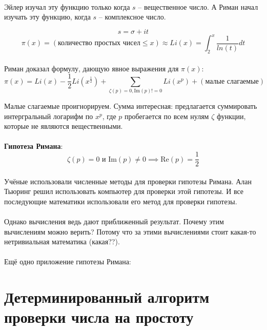 \documentclass{article}
\begin{document}
\paragraph{}
Эйлер изучал эту функцию только когда $s$ -- вещественное число.
А Риман начал изучать эту функцию, когда $s$ -- комплексное число.

$$ s = \sigma + it $$
$$ \pi(x) = (\text{количество простых чисел} \le x) \approx Li(x)
    = \int_{2}^{x} \frac{1}{ln(t)} dt
$$


\paragraph{}
Риман доказал формулу, дающую явное выражения для $\pi(x)$:
$$
    \pi(x) = Li(x) - \frac{1}{2} Li(x^\frac{1}{2}) + \sum_{{\zeta(p) = 0}, \text{Im}(p) != 0}
    Li(x^p) + (\text{малые слагаемые})
$$

Малые слагаемые проигнорируем. Сумма интересная: предлагается суммировать
интергральный логарифм по $x^p$, где $p$ пробегается по всем нулям $\zeta$ функции,
которые не являются вещественными. 

\paragraph{}
\textbf{Гипотеза Римана}:
$$
    \zeta(p) = 0 \text{ и } \text{Im}(p) \ne 0 \implies \text{Re}(p) = \frac{1}{2}
$$

\paragraph{}
Учёные использовали численные методы для проверки гипотезы Римана.
Алан Тьюринг решил использовать компьютер для проверки этой гипотезы.
И все последующие математики использовали его метод для проверки гипотезы.

\paragraph{}
Однако вычисления ведь дают приближенный результат. Почему этим вычислениям можно верить?
Потому что за этими вычислениями стоит какая-то нетривиальная математика (какая??).

\paragraph{}
Ещё одно приложение гипотезы Римана:

\section{Детерминированный алгоритм проверки числа на простоту}
\end{document}

